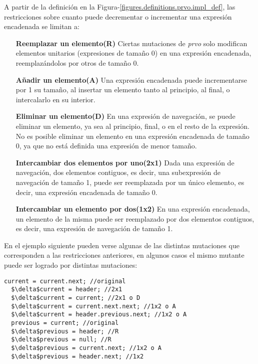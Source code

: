 A partir de la definici\'on en la Figura-\ref{figures.definitions.prvo.impl_def}, las restricciones sobre cuanto puede decrementar o incrementar una expresi\'on encadenada se limitan a:

\begin{enumerate}[leftmargin=.75cm,align=left]
	\item[\textbf{Reemplazar un elemento(R)}] Ciertas mutaciones de \emph{prvo} solo modifican elementos unitarios (expresiones de tama\~no 0) en una expresi\'on encadenada, reemplaz\'andolos por otros de tama\~no 0.
	
	\item[\textbf{A\~nadir un elemento(A)}] Una expresi\'on encadenada puede incrementarse por 1 su tama\~no, al insertar un elemento tanto al principio, al final, o intercalarlo en su interior.
	
	\item[\textbf{Eliminar un elemento(D)}] En una expresi\'on de navegaci\'on, se puede eliminar un elemento, ya sea al principio, final, o en el resto de la expresi\'on. No es posible eliminar un elemento en una expresi\'on encadenada de tama\~no 0, ya que no est\'a definida una expresi\'on de menor tama\~no.
	
	\item[\textbf{Intercambiar dos elementos por uno(2x1)}] Dada una expresi\'on de navegaci\'on, dos elementos contiguos, es decir, una subexpresi\'on de navegaci\'on de tama\~no 1, puede ser reemplazada por un \'unico elemento, es decir, una expresi\'on encadenada de tama\~no 0.
	
	\item[\textbf{Intercambiar un elemento por dos(1x2)}] En una expresi\'on encadenada, un elemento de la misma puede ser reemplazado por dos elementos contiguos, es decir, una expresi\'on de navegaci\'on de tama\~no 1.
\end{enumerate}

En el ejemplo siguiente pueden verse algunas de las distintas mutaciones que corresponden a las restricciones anteriores, en algunos casos el mismo mutante puede ser logrado por distintas mutaciones:
\begin{lstlisting}[mathescape=true]
  current = current.next; //original
  $\delta$current = header; //2x1
  $\delta$current = current; //2x1 o D 
  $\delta$current = current.next.next; //1x2 o A
  $\delta$current = header.previous.next; //1x2 o A
  previous = current; //original
  $\delta$previous = header; //R
  $\delta$previous = null; //R
  $\delta$previous = current.next; //1x2 o A
  $\delta$previous = header.next; //1x2
\end{lstlisting}

